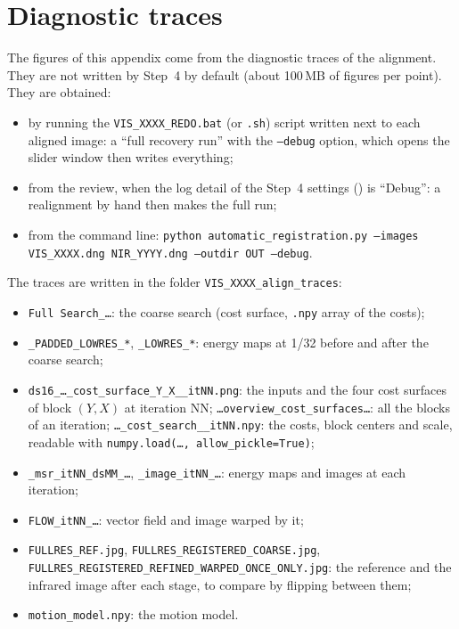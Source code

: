 \documentclass[a4paper,11pt]{report}
\DeclareRobustCommand{\bouton}[1]{\texorpdfstring{\fbox{\small\textsf{#1}}}{#1}}
\begin{document}
\section{Diagnostic traces}\label{sec:ann_traces}
The figures of this appendix come from the diagnostic traces of the alignment. They are not written by Step~4 by default (about 100\,MB of figures per point). They are obtained:
\begin{itemize}
	\item by running the \texttt{VIS\_XXXX\_REDO.bat} (or \texttt{.sh}) script written next to each aligned image: a ``full recovery run'' with the \texttt{--debug} option, which opens the slider window then writes everything;
	\item from the review, when the log detail of the Step~4 settings (\bouton{⚙}) is ``Debug'': a realignment by hand then makes the full run;
	\item from the command line: \texttt{python automatic\_registration.py --images VIS\_XXXX.dng NIR\_YYYY.dng --outdir OUT --debug}.
\end{itemize}
The traces are written in the folder \texttt{VIS\_XXXX\_align\_traces}:
\begin{itemize}
	\item \texttt{Full Search\_\ldots}: the coarse search (cost surface, \texttt{.npy} array of the costs);
	\item \texttt{\_PADDED\_LOWRES\_*}, \texttt{\_LOWRES\_*}: energy maps at 1/32 before and after the coarse search;
	\item \texttt{ds16\_\ldots\_cost\_surface\_Y\_X\_\_itNN.png}: the inputs and the four cost surfaces of block $(Y, X)$ at iteration NN; \texttt{\ldots overview\_cost\_surfaces\ldots}: all the blocks of an iteration; \texttt{\ldots\_cost\_search\_\_itNN.npy}: the costs, block centers and scale, readable with \texttt{numpy.load(\ldots, allow\_pickle=True)};
	\item \texttt{\_msr\_itNN\_dsMM\_\ldots}, \texttt{\_image\_itNN\_\ldots}: energy maps and images at each iteration;
	\item \texttt{FLOW\_itNN\_\ldots}: vector field and image warped by it;
	\item \texttt{FULLRES\_REF.jpg}, \texttt{FULLRES\_REGISTERED\_COARSE.jpg}, \texttt{FULLRES\_REGISTERED\_REFINED\_WARPED\_ONCE\_ONLY.jpg}: the reference and the infrared image after each stage, to compare by flipping between them;
	\item \texttt{motion\_model.npy}: the motion model.
\end{itemize}
\end{document}
